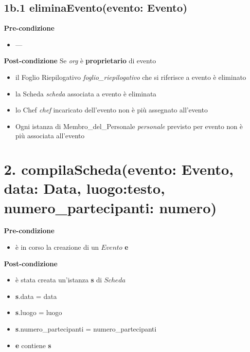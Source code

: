 \documentclass[12pt]{extarticle}
\begin{document}
\subsection*{1b.1 eliminaEvento(evento: Evento)}

\textbf{Pre-condizione}
\begin{itemize}
  \item ---
\end{itemize}
\textbf{Post-condizione} Se \textit{org} è \textbf{proprietario} di evento
\begin{itemize}
  \item il Foglio Riepilogativo \textit{foglio\_riepilogativo} che si riferisce a evento è eliminato
  \item la Scheda \textit{scheda} associata a evento è eliminata
  \item lo Chef \textit{chef} incaricato dell'evento non è più assegnato all'evento
  \item Ogni istanza di Membro\_del\_Personale \textit{personale} previsto per evento non è più associata all'evento
\end{itemize}


\section*{2. compilaScheda(evento: Evento, data: Data, luogo:testo, numero\_partecipanti: numero)}

\textbf{Pre-condizione}
\begin{itemize}
  \item è in corso la creazione di un $Evento$ \textbf{e}
\end{itemize} 
\textbf{Post-condizione} 
\begin{itemize}
  \item è stata creata un'istanza \textbf{s} di $Scheda$
  \item \textbf{s}.data = data
  \item \textbf{s}.luogo = luogo
  \item \textbf{s}.numero\_partecipanti = numero\_partecipanti
  \item \textbf{e} contiene \textbf{s}
\end{itemize}
\end{document}
